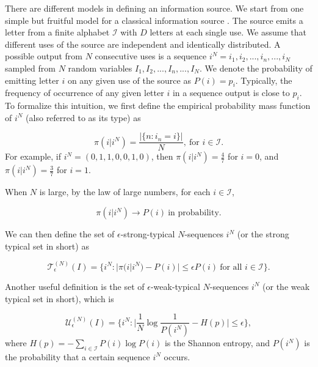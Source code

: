 \documentclass[11pt]{article}
\begin{document}
There are different models in defining an information source. We start from one simple but fruitful model for a classical information source \cite{network}. The source emits a letter from a finite alphabet $\mathcal{I}$ with $D$ letters at each single use. We assume that different uses of the source are independent and identically distributed. A possible output from $N$ consecutive uses is a sequence $i^N = i_1, i_2, ... , i_n, ... , i_N$ sampled from $N$ random variables $I_1, I_2, ... , I_n, ... , I_N$. We denote the probability of emitting letter $i$ on any given use of the source as $P(i) = p_i$. Typically, the frequency of occurrence of any given letter $i$ in a sequence output is close to $p_i$. To formalize this intuition, we first define the empirical probability mass function of $i^N$ (also referred to as its type) as 

\begin{equation}
    \pi(i|i^N) = \frac{|\{n: i_n = i\}|}{N}, \ \text{for $i \in \mathcal{I}$}.
\end{equation}
For example, if $i^N = (0, 1, 1, 0, 0, 1, 0)$, then $\pi (i|i^N) = \frac{4}{7}$ for $i = 0$, and $\pi(i|i^N) = \frac{3}{7}$ for $i = 1$.

When $N$ is large, by the law of large numbers, for each $i \in \mathcal{I}$, 

\begin{equation}
    \pi(i|i^N) \xrightarrow{} P(i) \ \text{in probability}.
\end{equation}

We can then define the set of $\epsilon$-strong-typical $N$-sequences $i^N$ (or the strong typical set in short) as

\begin{equation}
    \mathcal{T}_{\epsilon}^{(N)} (I) = 
\{i^N: |\pi(i|i^N) - P(i)| \leq \epsilon P(i) \ \text{for all } i \in \mathcal{I}
\}.
\end{equation}

Another useful definition is the set of $\epsilon$-weak-typical $N$-sequences $i^N$ (or the weak typical set in short), which is

\begin{equation}
    \mathcal{U}_{\epsilon}^{(N)} (I) = 
\Big\{i^N: \Big|\frac{1}{N} \log \frac{1}{P(i^N)} - H(p)\Big| \leq \epsilon
\Big\},
\end{equation}
where $H(p) = - \sum_{i \in \mathcal{I}} P(i) \log P(i)$ is the Shannon entropy, and $P(i^N)$ is the probability that a certain sequence $i^N$ occurs.
\end{document}
